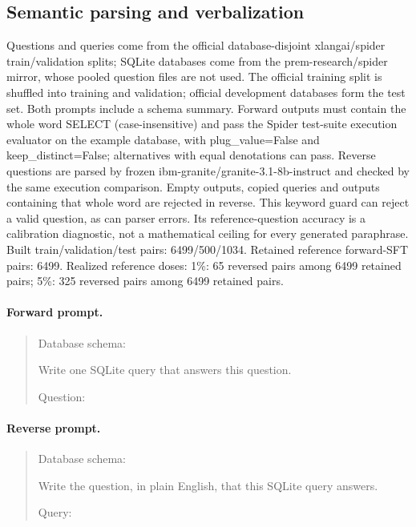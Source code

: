 \subsection{Semantic parsing and verbalization}
Questions and queries come from the official database-disjoint xlangai/spider train/validation splits; SQLite databases come from the prem-research/spider mirror, whose pooled question files are not used. The official training split is shuffled into training and validation; official development databases form the test set. Both prompts include a schema summary. Forward outputs must contain the whole word SELECT (case-insensitive) and pass the Spider test-suite execution evaluator on the example database, with plug\_value=False and keep\_distinct=False; alternatives with equal denotations can pass. Reverse questions are parsed by frozen ibm-granite/granite-3.1-8b-instruct and checked by the same execution comparison. Empty outputs, copied queries and outputs containing that whole word are rejected in reverse. This keyword guard can reject a valid question, as can parser errors. Its reference-question accuracy is a calibration diagnostic, not a mathematical ceiling for every generated paraphrase.
Built train/validation/test pairs: 6499/500/1034. Retained reference forward-SFT pairs: 6499. 
Realized reference doses: 1\%: 65 reversed pairs among 6499 retained pairs; 5\%: 325 reversed pairs among 6499 retained pairs.
\paragraph{Forward prompt.}
\begin{quote}\small\ttfamily
Database schema:\par <DATABASE SCHEMA>\par \par Write one SQLite query that answers this question.\par \par Question:\par <INPUT A>
\end{quote}
\paragraph{Reverse prompt.}
\begin{quote}\small\ttfamily
Database schema:\par <DATABASE SCHEMA>\par \par Write the question, in plain English, that this SQLite query answers.\par \par Query:\par <INPUT B>
\end{quote}
